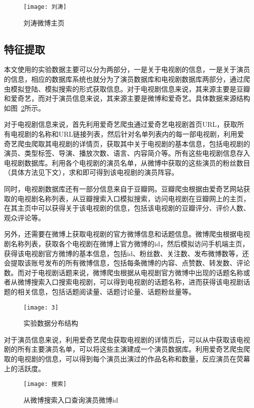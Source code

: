 \begin{figure}[h] 
  \centering
  \texttt{[image: 刘涛]}
  \caption{刘涛微博主页}
  \label{刘涛}
\end{figure}

\subsection{特征提取}

本文使用的实验数据主要可以分为两部分，一是关于电视剧的信息，一是关于演员的信息，相应的数据库系统也就分为了演员数据库和电视剧数据库两部分，通过爬虫模拟登陆、模拟搜索的形式获取信息。对于电视剧信息来说，其来源主要是豆瓣和爱奇艺，而对于演员信息来说，其来源主要是微博和爱奇艺。具体数据来源结构如图~\ref{3}所示。

对于电视剧信息来说，首先利用爱奇艺爬虫通过爱奇艺电视剧首页URL，获取所有电视剧的名称和URL链接列表，然后针对名单列表内的每一部电视剧，利用爱奇艺爬虫爬取其电视剧的详情页，获取其中关于电视剧的基本信息，包括电视剧的演员、类型标签、导演、播放次数、语言、内容简介等。所有这些电视剧信息存入电视剧数据库。利用各个电视剧的演员名单，从微博中获取的这些演员的粉丝数目（具体方法见下文），求和即可得到该电视剧的演员阵容。

同时，电视剧数据库还有一部分信息来自于豆瓣网。豆瓣爬虫根据由爱奇艺网站获取的电视剧名称列表，从豆瓣搜索入口模拟搜索，访问电视剧在豆瓣网上的主页，在其主页中可以获得关于该电视剧的信息，包括该电视剧的豆瓣评分、评价人数、观众评论等。

另外，还需要在微博上获取电视剧的官方微博信息和话题信息。微博爬虫根据电视剧名称列表，获取各个电视剧在微博上官方微博的id，然后模拟访问手机端主页，获得该电视剧官方微博的基本信息，包括id、粉丝数、关注数、发布微博数等，还会提取该账号发布的所有微博信息，包括每条微博的内容、点赞数、转发数、评论数。而对于电视剧话题来说，微博爬虫根据从电视剧官方微博中出现的话题名称或者从微博搜索入口搜索电视剧，可以得到电视剧的话题名称，进而获得该电视剧话题的相关信息，包括话题阅读量、话题讨论量、话题粉丝量等。

\begin{figure}[H]
\centering
\texttt{[image: 3]}
\caption{实验数据分布结构}
\label{3}
\end{figure}

对于演员信息来说，利用爱奇艺爬虫获取电视剧的详情页后，可以从中获取该电视剧的所有主要演员名单，可以将这些主演建成一个演员数据库。利用爱奇艺爬虫爬取的电视剧的信息，可以得到每个演员出演过的作品名称和数量，反应演员在荧幕上的活跃度。

\begin{figure}[H]
\centering
\texttt{[image: 搜索]}
\caption{从微博搜索入口查询演员微博id}
\label{搜索}
\end{figure}


